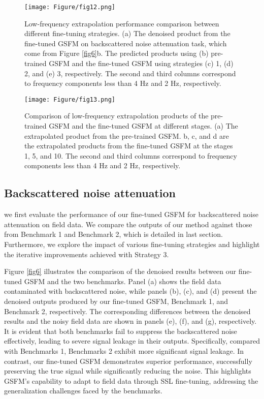 \begin{figure*}[htbp]
\centering
\texttt{[image: Figure/fig12.png]}
\caption{Low-frequency extrapolation performance comparison between different fine-tuning strategies. (a) The denoised product from the fine-tuned GSFM on backscattered noise attenuation task, which come from Figure \ref{fig6}b. The predicted products using (b) pre-trained GSFM and the fine-tuned GSFM using strategies (c) 1, (d) 2, and (e) 3, respectively. The second and third columns correspond to frequency components less than 4 Hz and 2 Hz, respectively. }
\label{fig12}
\end{figure*}

\begin{figure*}[htbp]
\centering
\texttt{[image: Figure/fig13.png]}
\caption{Comparison of low-frequency extrapolation products of the pre-trained GSFM and the fine-tuned GSFM at different stages. (a) The extrapolated product from the pre-trained GSFM. b, c, and d are the extrapolated products from the fine-tuned GSFM at the stages 1, 5, and 10. The second and third columns correspond to frequency components less than 4 Hz and 2 Hz, respectively.}
\label{fig13}
\end{figure*}

\subsection{Backscattered noise attenuation}
we first evaluate the performance of our fine-tuned GSFM for backscattered noise attenuation on field data. We compare the outputs of our method against those from Benchmark 1 and Benchmark 2, which is detailed in last section. Furthermore, we explore the impact of various fine-tuning strategies and highlight the iterative improvements achieved with Strategy 3. 

Figure \ref{fig6} illustrates the comparison of the denoised results between our fine-tuned GSFM and the two benchmarks. Panel (a) shows the field data contaminated with backscattered noise, while panels (b), (c), and (d) present the denoised outputs produced by our fine-tuned GSFM, Benchmark 1, and Benchmark 2, respectively. The corresponding differences between the denoised results and the noisy field data are shown in panels (e), (f), and (g), respectively. It is evident that both benchmarks fail to suppress the backscattered noise effectively, leading to severe signal leakage in their outputs. Specifically, compared with Benchmarks 1, Benchmarks 2 exhibit more significant signal leakage. In contrast, our fine-tuned GSFM demonstrates superior performance, successfully preserving the true signal while significantly reducing the noise. This highlights GSFM’s capability to adapt to field data through SSL fine-tuning, addressing the generalization challenges faced by the benchmarks. 

